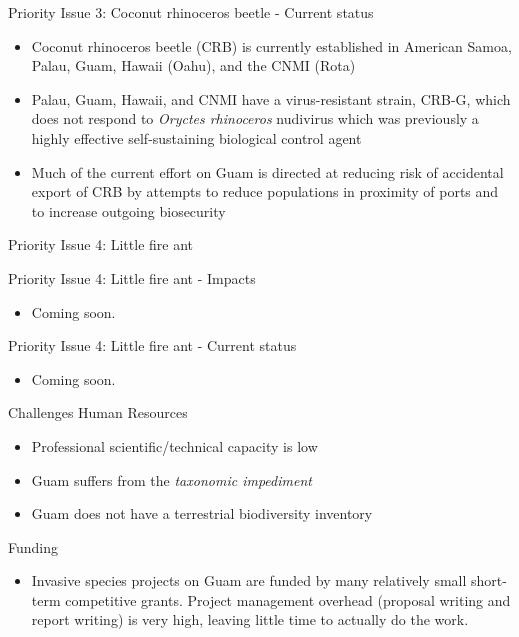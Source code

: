 \documentclass[]{beamer}
\begin{document}
\begin{frame}{Priority Issue 3: Coconut rhinoceros beetle - Current status}
	\begin{itemize}
		\item Coconut rhinoceros beetle (CRB) is currently established in American Samoa, Palau, Guam, Hawaii (Oahu), and the CNMI (Rota)
		\item Palau, Guam, Hawaii, and CNMI have a virus-resistant strain, CRB-G, which does not respond to \textit{Oryctes rhinoceros} nudivirus which was previously a highly effective self-sustaining biological control agent
		\item Much of the current effort on Guam is directed at reducing risk of accidental export of CRB by attempts to reduce populations in proximity of ports and to increase outgoing biosecurity 
	\end{itemize}
\end{frame}

\begin{frame}{Priority Issue 4: Little fire ant}	
	\begin{figure}
	\end{figure}
\end{frame}

\begin{frame}{Priority Issue 4: Little fire ant - Impacts}	
	\begin{itemize}
		\item Coming soon.
	\end{itemize}
\end{frame}

\begin{frame}{Priority Issue 4: Little fire ant - Current status}	
	\begin{itemize}
		\item Coming soon.
	\end{itemize}
\end{frame}

\begin{frame}{Challenges}
	Human Resources
	\begin{itemize}
		\item Professional scientific/technical capacity is low
		\item Guam suffers from the \textit{taxonomic impediment}
		\item Guam does not have a terrestrial biodiversity inventory
	\end{itemize}
	Funding
	\begin{itemize}
		\item Invasive species projects on Guam are funded by many relatively small short-term competitive grants. Project management overhead (proposal writing and report writing) is very high, leaving little time to actually do the work.
	\end{itemize}
\end{frame}
\end{document}
